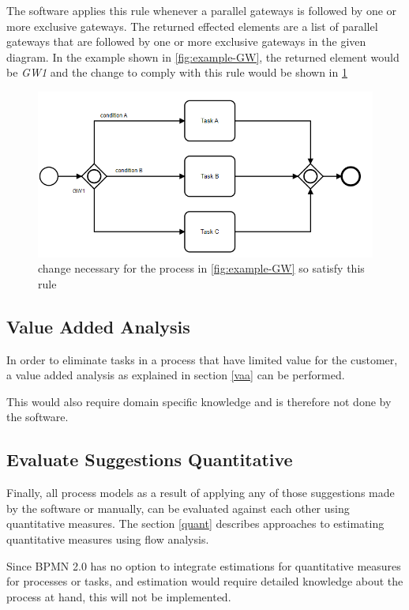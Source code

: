 The software applies this rule whenever a parallel gateways is followed by one or more exclusive gateways. The returned effected elements are a list of parallel gateways that are followed by one or more exclusive gateways in the given diagram. In the example shown in  \ref{fig:example-GW}, the returned element would be \textit{GW1} and the change to comply with this rule would be shown in \ref{fig:example-GW-fix}
\begin{figure}[H]
	\centering
	\includegraphics[width=0.9\columnwidth]{graphics/exclusive-suggestion-2}
	\caption{change necessary for the process in \ref{fig:example-GW} so satisfy this rule} 
	\label{fig:example-GW-fix} 
\end{figure}

\subsection{Value Added Analysis}
In order to eliminate tasks in a process that have limited value for the customer, a value added analysis as explained in section \ref{vaa} can be performed.  

This would also require domain specific knowledge and is therefore not done by the software. 

\subsection{Evaluate Suggestions Quantitative}

Finally, all process models as a result of applying any of those suggestions made by the software or manually, can be evaluated against each other using quantitative measures. The section \ref{quant} describes approaches to estimating quantitative measures using flow analysis. 

Since BPMN 2.0 has no option to integrate estimations for quantitative measures for processes or tasks, and estimation would require detailed knowledge about the process at hand, this will not be implemented.